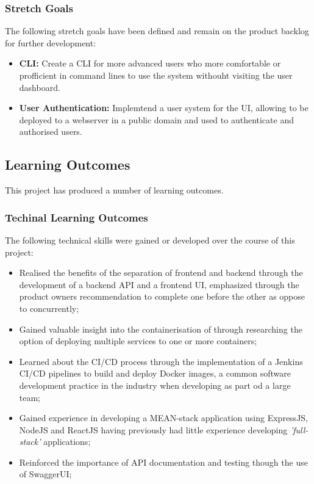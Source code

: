   \subsubsection{Stretch Goals}
  The following stretch goals have been defined and remain on the product backlog for further development:
  
  \begin{itemize}
    \item \textbf{CLI:} Create a CLI for more advanced users who more comfortable or profficient in command lines to use the system withouht visiting the user dashboard.
    \item \textbf{User Authentication: } Implemtend a user system for the UI, allowing to be deployed to a webserver in a public domain and used to authenticate and authorised users.
  \end{itemize}
  

	\subsection{Learning Outcomes}
  This project has produced a number of learning outcomes.
  
  \subsubsection{Techinal Learning Outcomes}
  The following technical skills were gained or developed over the course of this project:
  
  \begin{itemize}
    \item Realised the benefits of the separation of frontend and backend through the development of a backend API and a frontend UI, emphasized through the product owners recommendation to complete one before the other as oppose to concurrently;
    \item Gained valuable insight into the containerisation of through researching the option of deploying multiple services to one or more containers;
    \item Learned about the CI/CD process through the implementation of a Jenkins CI/CD pipelines to build and deploy Docker images, a common software development practice in the industry when developing as part od a large team;
    \item Gained experience in developing a MEAN-stack application using ExpressJS, NodeJS and ReactJS having previously had little experience developing \textit{'full-stack'} applications;
    \item Reinforced the importance of API documentation and testing though the use of SwaggerUI;
  \end{itemize}
  
